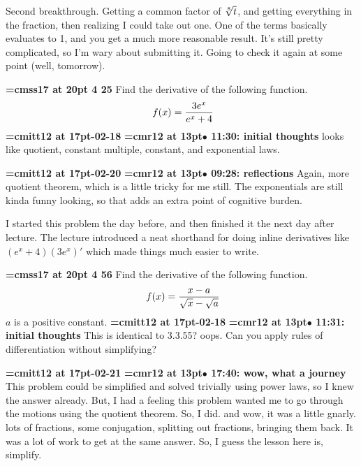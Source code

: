 Second breakthrough. Getting a common factor of $\root 8 \of {t}$, and getting everything in the fraction, then realizing I could take out one. One of the terms basically evaluates to 1, and you get a much more reasonable result. It's still pretty complicated, so I'm wary about submitting it. Going to check it again at some point (well, tomorrow).
\par

{\medskip\noindent\bf\font\titlefont=cmss17 at 20pt 4 25}\medskip
Find the derivative of the following function.
$$\
f(x) = {3e^x \over e^x + 4}
$$
{\medskip\noindent\bf\font\titlefont=cmitt12 at 17pt-02-18}\medskip
{\smallskip\noindent\bf\font\titlefont=cmr12 at 13pt\titlefont $\bullet$ 11:30: initial thoughts}\smallskip
looks like quotient, constant multiple, constant, and exponential laws.
\par

{\medskip\noindent\bf\font\titlefont=cmitt12 at 17pt-02-20}\medskip
{\smallskip\noindent\bf\font\titlefont=cmr12 at 13pt\titlefont $\bullet$ 09:28: reflections}\smallskip
Again, more quotient theorem, which is a little tricky for me still. The exponentials are still kinda funny looking, so that adds an extra point of cognitive burden.
\par

I started this problem the day before, and then finished it the next day after lecture. The lecture introduced a neat shorthand for doing inline derivatives like $(e^x + 4)(3e^x)'$ which made things much easier to write.
\par

{\medskip\noindent\bf\font\titlefont=cmss17 at 20pt 4 56}\medskip
Find the derivative of the following function.
$$\
f(x) = {x - a \over \sqrt{x} - \sqrt{a}}
$$
$a$ is a positive constant.
{\medskip\noindent\bf\font\titlefont=cmitt12 at 17pt-02-18}\medskip
{\smallskip\noindent\bf\font\titlefont=cmr12 at 13pt\titlefont $\bullet$ 11:31: initial thoughts}\smallskip
This is identical to 3.3.55? oops. Can you apply rules of differentiation without simplifying?
\par

{\medskip\noindent\bf\font\titlefont=cmitt12 at 17pt-02-21}\medskip
{\smallskip\noindent\bf\font\titlefont=cmr12 at 13pt\titlefont $\bullet$ 17:40: wow, what a journey}\smallskip
This problem could be simplified and solved trivially using power laws, so I knew the answer already. But, I had a feeling this problem wanted me to go through the motions using the quotient theorem. So, I did. and wow, it was a little gnarly. lots of fractions, some conjugation, splitting out fractions, bringing them back. It was a lot of work to get at the same answer. So, I guess the lesson here is, simplify.
\par

